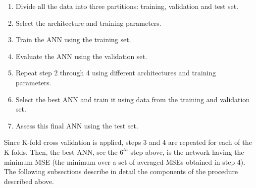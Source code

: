 \begin{enumerate}
 \item Divide all the data into three partitions: training, validation and test set.
 \item Select the architecture and training parameters.
 \item Train the ANN using the training set.
 \item Evaluate the ANN using the validation set.
 \item Repeat step 2 through 4 using different architectures and training parameters.
 \item Select the best ANN and train it using data from the training and validation set.
 \item Assess this final ANN using the test set.
\end{enumerate}
Since K-fold cross validation is applied, steps 3 and 4 are repeated for each of the K folds. Then, the best ANN, see the $6^{th}$ step above, is the network having the minimum MSE (the minimum over a set of averaged MSEs obtained in step 4). The following subsections describe in detail the components of the procedure described above.

